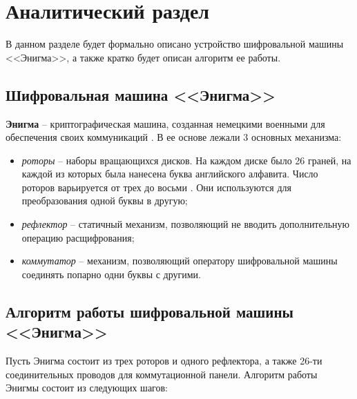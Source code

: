 \chapter{Аналитический раздел}

В данном разделе  будет формально описано устройство шифровальной машины <<Энигма>>, а также кратко будет описан алгоритм ее работы.

\section{Шифровальная машина <<Энигма>>}

\textbf{Энигма} -- криптографическая машина, созданная немецкими военными для обеспечения своих коммуникаций \cite{info_Enigma1}. В ее основе лежали 3 основных механизма:

\begin{itemize}
	\item \textit{роторы} -- наборы вращающихся дисков. На каждом диске было 26 граней, на каждой из которых была нанесена буква английского алфавита. Число роторов варьируется от трех до восьми \cite{info_Enigma1, info_Enigma2}. Они используются для преобразования одной буквы в другую; 
	\item \textit{рефлектор} -- статичный механизм, позволяющий не вводить дополнительную операцию расщифрования; 
	\item \textit{коммутатор} -- механизм, позволяющий оператору шифровальной машины соединять попарно одни буквы с другими.
\end{itemize}

\section{Алгоритм работы шифровальной машины <<Энигма>>}

Пусть Энигма состоит из трех роторов и  одного рефлектора, а также 26-ти соединительных проводов для коммутационной панели. Алгоритм работы Энигмы состоит из следующих шагов:

